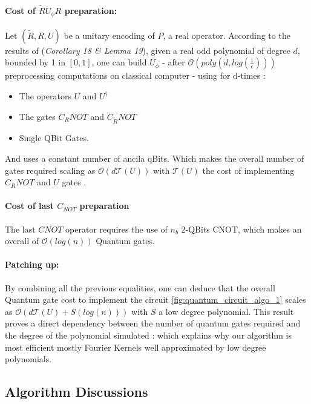 \documentclass[sn-mathphys]{sn-jnl}%
\theoremstyle{thmstyleone}%
\theoremstyle{thmstyletwo}%
\theoremstyle{thmstylethree}%
\begin{document}
\paragraph{Cost of $\widetilde{R}U_\phi R$ preparation:}
Let $(\widetilde{R}, R, U)$ be a unitary encoding of $P$, a real
operator. According to the results of \cite{gilyen_su_low_wiebe_2019}
(\textit{Corollary 18 \& Lemma 19}), given a real odd polynomial of
degree $d$, bounded by 1 in $[0,1]$, one can build $U_\phi$ - after
$\mathcal{O}(poly(d, log(\frac{1}{\epsilon})))$ preprocessing
computations on classical computer - using for d-times :
\begin{itemize}
    \item The operators $U$ and $U^\dagger$
    \item The gates $C_R NOT$ and $C_{\widetilde{R}} NOT$
    \item Single QBit Gates.
\end{itemize}
And uses a constant number of ancila qBits. Which makes the overall
number of gates required scaling as $\mathcal{O}(d \mathcal{T}(U))$
with $\mathcal{T}(U)$ the cost of implementing $C_R NOT$ and $U$ gates
\cite{gilyen_su_low_wiebe_2019}.

\paragraph{Cost of last $C_{NOT}$ preparation}

The last $CNOT$ operator requires the use of $n_b$ 2-QBits CNOT, which
makes an overall of $\mathcal{O}(log(n))$ Quantum gates.

\paragraph{Patching up:}
By combining all the previous equalities, one can deduce that the
overall Quantum gate cost to implement the circuit
\ref{fig:quantum_circuit_algo_1} scales as
$\mathcal{O}(d \mathcal{T}(U) + S(log(n)))$ with $S$ a low degree
polynomial. This result proves a direct dependency between the number
of quantum gates required and the degree of the polynomial simulated :
which explains why our algorithm is most efficient mostly Fourier
Kernels well approximated by low degree polynomials.

\subsection{Algorithm Discussions}\label{subsubsec:algo_1_extensions}
\end{document}

